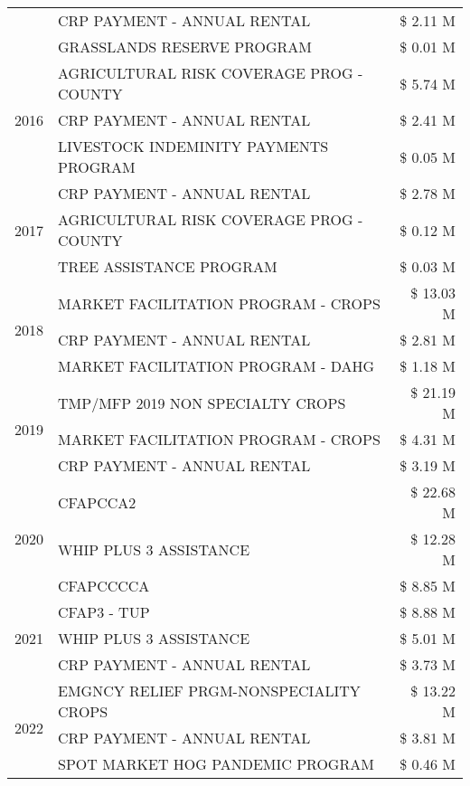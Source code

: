 \begin{tabular}{llr}
 & CRP PAYMENT - ANNUAL RENTAL & \$ 2.11 M \\
 & GRASSLANDS RESERVE PROGRAM & \$ 0.01 M \\
\cline{1-3}
\multirow[t]{3}{*}{2016} & AGRICULTURAL RISK COVERAGE PROG - COUNTY & \$ 5.74 M \\
 & CRP PAYMENT - ANNUAL RENTAL & \$ 2.41 M \\
 & LIVESTOCK INDEMINITY PAYMENTS PROGRAM & \$ 0.05 M \\
\cline{1-3}
\multirow[t]{3}{*}{2017} & CRP PAYMENT - ANNUAL RENTAL & \$ 2.78 M \\
 & AGRICULTURAL RISK COVERAGE PROG - COUNTY & \$ 0.12 M \\
 & TREE ASSISTANCE PROGRAM & \$ 0.03 M \\
\cline{1-3}
\multirow[t]{3}{*}{2018} & MARKET FACILITATION PROGRAM - CROPS & \$ 13.03 M \\
 & CRP PAYMENT - ANNUAL RENTAL & \$ 2.81 M \\
 & MARKET FACILITATION PROGRAM - DAHG & \$ 1.18 M \\
\cline{1-3}
\multirow[t]{3}{*}{2019} & TMP/MFP 2019 NON SPECIALTY CROPS & \$ 21.19 M \\
 & MARKET FACILITATION PROGRAM - CROPS & \$ 4.31 M \\
 & CRP PAYMENT - ANNUAL RENTAL & \$ 3.19 M \\
\cline{1-3}
\multirow[t]{3}{*}{2020} & CFAPCCA2 & \$ 22.68 M \\
 & WHIP PLUS 3 ASSISTANCE & \$ 12.28 M \\
 & CFAPCCCCA & \$ 8.85 M \\
\cline{1-3}
\multirow[t]{3}{*}{2021} & CFAP3 - TUP & \$ 8.88 M \\
 & WHIP PLUS 3 ASSISTANCE & \$ 5.01 M \\
 & CRP PAYMENT - ANNUAL RENTAL & \$ 3.73 M \\
\cline{1-3}
\multirow[t]{3}{*}{2022} & EMGNCY RELIEF PRGM-NONSPECIALITY CROPS & \$ 13.22 M \\
 & CRP PAYMENT - ANNUAL RENTAL & \$ 3.81 M \\
 & SPOT MARKET HOG PANDEMIC PROGRAM & \$ 0.46 M \\
\cline{1-3}
\bottomrule
\end{tabular}
